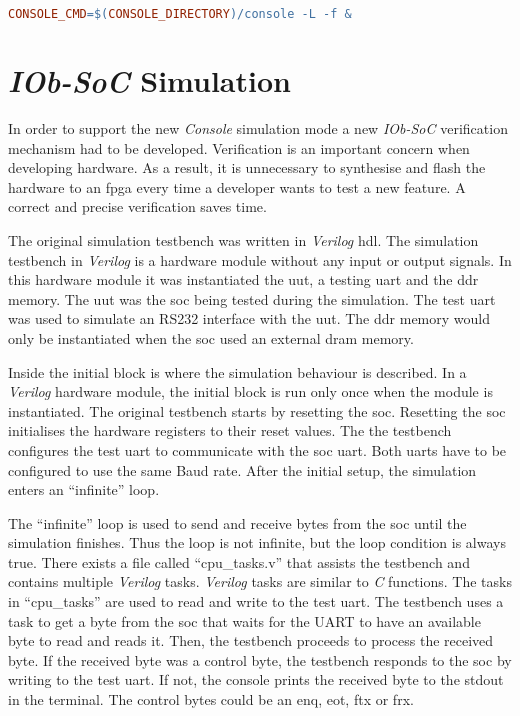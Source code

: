 \begin{lstlisting}[language=make, caption={Call \textit{Console} program}, label=lst:call_console]
    CONSOLE_CMD=$(CONSOLE_DIRECTORY)/console -L -f &
\end{lstlisting}

\section{\textit{IOb-SoC} Simulation}
\label{section:simulation}
In order to support the new \textit{Console} simulation mode a new \textit{IOb-SoC} verification mechanism had to be developed. Verification is an important concern when developing hardware. As a result, it is unnecessary to synthesise and flash the hardware to an \acrshort{fpga} every time a developer wants to test a new feature. A correct and precise verification saves time.

The original simulation testbench was written in \textit{Verilog} \acrshort{hdl}. The simulation testbench in \textit{Verilog} is a hardware module without any input or output signals. In this hardware module it was instantiated the \acrfull{uut}, a testing \acrshort{uart} and the \acrshort{ddr} memory. The \acrshort{uut} was the \acrshort{soc} being tested during the simulation. The test \acrshort{uart} was used to simulate an RS232 interface with the \acrshort{uut}. The \acrshort{ddr} memory would only be instantiated when the \acrshort{soc} used an external \acrshort{dram} memory.

Inside the initial block is where the simulation behaviour is described. In a \textit{Verilog} hardware module, the initial block is run only once when the module is instantiated. The original testbench starts by resetting the \acrshort{soc}. Resetting the \acrshort{soc} initialises the hardware registers to their reset values. The the testbench configures the test \acrshort{uart} to communicate with the \acrshort{soc} \acrshort{uart}. Both \acrshort{uart}s have to be configured to use the same Baud rate. After the initial setup, the simulation enters an \enquote{infinite} loop.

The \enquote{infinite} loop is used to send and receive bytes from the \acrshort{soc} until the simulation finishes. Thus the loop is not infinite, but the loop condition is always true. There exists a file called \enquote{cpu\_tasks.v} that assists the testbench and contains multiple \textit{Verilog} tasks.  \textit{Verilog} tasks are similar to \textit{C} functions. The tasks in \enquote{cpu\_tasks} are used to read and write to the test \acrshort{uart}. The testbench uses a task to get a byte from the \acrshort{soc} that waits for the UART to have an available byte to read and reads it. Then, the testbench proceeds to process the received byte. If the received byte was a control byte, the testbench responds to the \acrshort{soc} by writing to the test \acrshort{uart}. If not, the console prints the received byte to the stdout in the terminal. The control bytes could be an \acrfull{enq}, \acrfull{eot}, \acrfull{ftx} or \acrfull{frx}.

